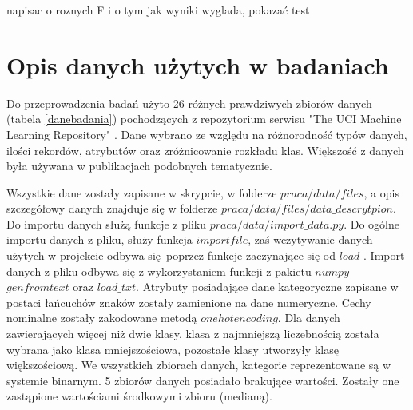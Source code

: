  napisac o roznych F i o tym jak wyniki wyglada, pokazać test

\section{Opis danych użytych w badaniach}
Do przeprowadzenia badań użyto 26 różnych prawdziwych zbiorów danych (tabela \ref{danebadania}) pochodzących z repozytorium serwisu "The UCI Machine Learning Repository" \cite{uci}. Dane wybrano ze względu na różnorodność typów danych, ilości rekordów, atrybutów oraz zróżnicowanie rozkładu klas. Większość z danych była używana w publikacjach podobnych tematycznie\cite{hyper}\cite{StefImbalanced}. \par
Wszystkie dane zostały zapisane w skrypcie, w folderze $praca/data/files$, a opis szczegółowy danych znajduje się w folderze $praca/data/files/data\_descrytpion$. Do importu danych służą funkcje z pliku $praca/data/import\_data.py$. Do ogólne importu danych z pliku, służy funkcja $importfile$, zaś wczytywanie danych użytych w projekcie odbywa się poprzez funkcje zaczynające się od $load\_$. Import danych z pliku odbywa się z wykorzystaniem funkcji z pakietu $numpy$ $genfromtext$ oraz $load\_txt$. Atrybuty posiadające dane kategoryczne zapisane w postaci łańcuchów znaków zostały zamienione na dane numeryczne. Cechy nominalne zostały zakodowane metodą $one hot encoding$. Dla danych zawierających więcej niż dwie klasy, klasa z najmniejszą liczebnością została wybrana jako klasa mniejszościowa, pozostałe klasy utworzyły klasę większościową. We wszystkich zbiorach danych, kategorie reprezentowane są w systemie binarnym. 5 zbiorów danych posiadało brakujące wartości. Zostały one zastąpione wartościami środkowymi zbioru (medianą).

